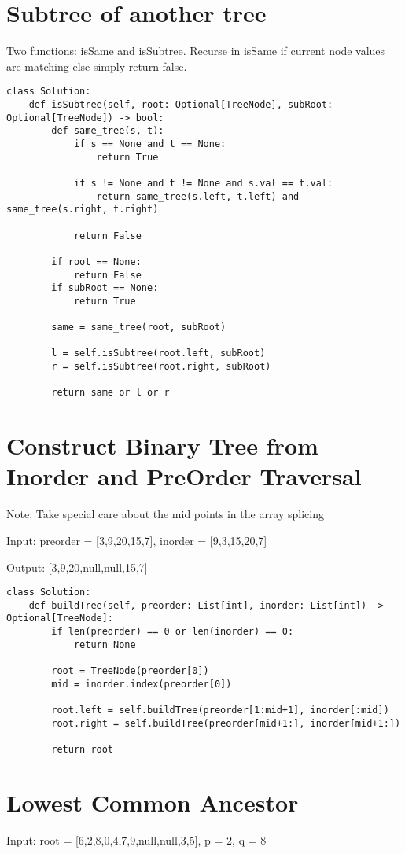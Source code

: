 \documentclass[24pt, a4]{article}
\begin{document}
\section{Subtree of another tree}
Two functions: isSame and isSubtree. Recurse in isSame if current node values are matching else simply return false.
\begin{lstlisting}
class Solution:
    def isSubtree(self, root: Optional[TreeNode], subRoot: Optional[TreeNode]) -> bool:
        def same_tree(s, t):
            if s == None and t == None:
                return True
            
            if s != None and t != None and s.val == t.val:
                return same_tree(s.left, t.left) and same_tree(s.right, t.right)

            return False
        
        if root == None:
            return False
        if subRoot == None:
            return True
        
        same = same_tree(root, subRoot)
         
        l = self.isSubtree(root.left, subRoot)
        r = self.isSubtree(root.right, subRoot)
        
        return same or l or r
\end{lstlisting}

\section{Construct Binary Tree from Inorder and PreOrder Traversal}
Note: Take special care about the mid points in the array splicing

Input: preorder = [3,9,20,15,7], inorder = [9,3,15,20,7]

Output: [3,9,20,null,null,15,7]
\begin{lstlisting}
class Solution:
    def buildTree(self, preorder: List[int], inorder: List[int]) -> Optional[TreeNode]:
        if len(preorder) == 0 or len(inorder) == 0:
            return None
        
        root = TreeNode(preorder[0])
        mid = inorder.index(preorder[0])
        
        root.left = self.buildTree(preorder[1:mid+1], inorder[:mid])
        root.right = self.buildTree(preorder[mid+1:], inorder[mid+1:])
        
        return root
\end{lstlisting}

\section{Lowest Common Ancestor}
Input: root = [6,2,8,0,4,7,9,null,null,3,5], p = 2, q = 8
\end{document}
